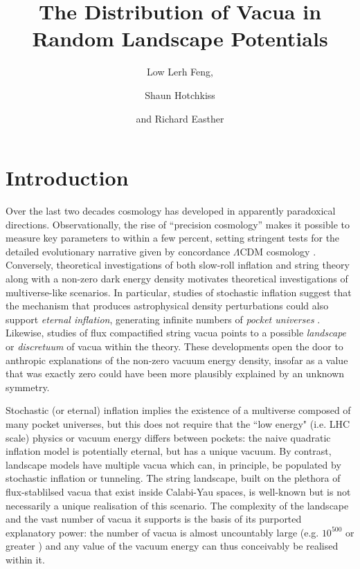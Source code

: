 \documentclass[12pt]{article}
\title{The Distribution of Vacua in Random Landscape Potentials}
\author{Low Lerh Feng,}
\author{Shaun Hotchkiss}
\author{and Richard Easther}
\affiliation{Department of Physics,\\ University of Auckland, \\Private Bag 92019,\\ Auckland, New Zealand}
\begin{document}
\maketitle

\section{Introduction}

Over the last two decades cosmology has developed in apparently paradoxical directions. Observationally, the rise of ``precision cosmology'' makes it possible to measure key parameters to within a few percent, setting stringent tests for the detailed evolutionary narrative given by concordance $\Lambda$CDM cosmology \cite{Planck2018,DES}. Conversely, theoretical investigations of both slow-roll inflation and string theory along with a non-zero dark energy density motivates  theoretical investigations of multiverse-like scenarios. In particular, studies of stochastic inflation \cite{Linde1986,Adshead2007} suggest that the mechanism that produces astrophysical density perturbations could also support {\em eternal inflation\/}, generating infinite numbers of  {\em pocket universes\/} \cite{Guth2001}. Likewise, studies of flux compactified string vacua points to a possible  {\em landscape\/} \cite{Susskind2003} or {\em discretuum\/} \cite{Bousso2000}   of vacua within the theory. These developments open the door to anthropic explanations of the non-zero vacuum energy density, insofar as a value that was  exactly zero could have been more plausibly explained by an unknown symmetry. 

Stochastic (or eternal) inflation implies the existence of a multiverse composed of many pocket universes, but this does not require that the ``low energy" (i.e. LHC scale) physics or vacuum energy differs between pockets:  the naive quadratic inflation model is potentially eternal, but has a unique vacuum.  By contrast, landscape models have multiple vacua which can, in principle, be populated by stochastic inflation or tunneling. The string landscape, built on the plethora of flux-stablilsed vacua that exist inside Calabi-Yau spaces, is well-known but  is not necessarily a unique realisation of this scenario. The complexity of the landscape  and the vast number of vacua it supports is the basis of its purported explanatory power: the number of vacua is almost uncountably large (e.g. $10^{500}$ or greater \cite{Douglas2003}) and any value of the vacuum energy can thus conceivably be realised within it. 
 
\end{document}

